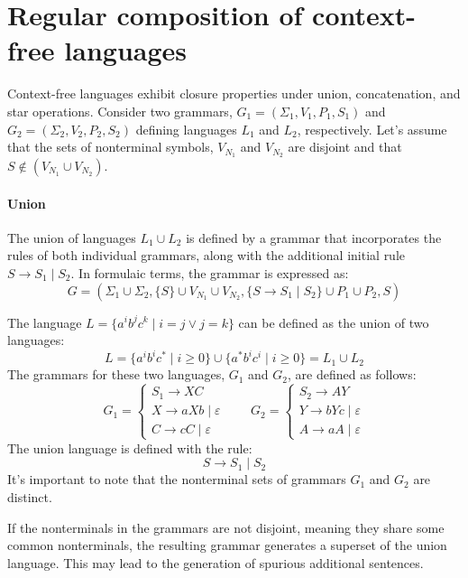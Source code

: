 \section{Regular composition of context-free languages}

Context-free languages exhibit closure properties under union, concatenation, and star operations.
Consider two grammars, $G_1=(\Sigma_1,V_1,P_1,S_1)$ and $G_2=(\Sigma_2,V_2,P_2,S_2)$ defining languages $L_1$ and $L_2$, respectively.
Let's assume that the sets of nonterminal symbols, $V_{N_1}$ and $V_{N_2}$ are disjoint and that $S \notin (V_{N_1} \cup V_{N_2})$. 

\paragraph*{Union}
The union of languages $L_1 \cup L_2$ is defined by a grammar that incorporates the rules of both individual grammars, along with the additional initial rule $S\rightarrow S_1\mid S_2$. 
In formulaic terms, the grammar is expressed as:
\[G=\left(\Sigma_1 \cup \Sigma_2,\{S\} \cup V_{N_1} \cup V_{N_2},\{S\rightarrow S_1\mid S_2\} \cup P_1 \cup P_2,S\right)\]
\begin{example}
    The language $L=\{a^ib^jc^k\mid i=j \lor j=k\}$ can be defined as the union of two languages:
    \[L=\{a^ib^ic^{\ast}\mid i \geq 0\} \cup \{a^{\ast}b^ic^i\mid i \geq 0\}=L_1 \cup L_2\]
    The grammars for these two languages, $G_1$ and $G_2$, are defined as follows:
    \[G_1=\begin{cases}
        S_1 \rightarrow XC \\
        X \rightarrow aXb\mid\varepsilon \\
        C \rightarrow cC\mid\varepsilon
    \end{cases}\qquad G_2=
    \begin{cases}
        S_2 \rightarrow AY \\
        Y \rightarrow bYc\mid\varepsilon \\
        A \rightarrow aA\mid\varepsilon
    \end{cases}\]
    The union language is defined with the rule:
    \[S \rightarrow S_1\mid S_2\]
    It's important to note that the nonterminal sets of grammars $G_1$ and $G_2$ are distinct.
\end{example}
If the nonterminals in the grammars are not disjoint, meaning they share some common nonterminals, the resulting grammar generates a superset of the union language.
This may lead to the generation of spurious additional sentences.

